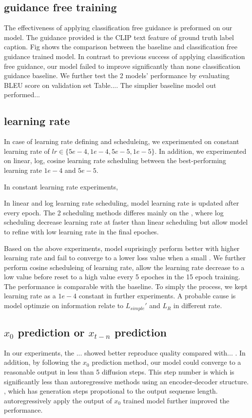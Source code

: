 \documentclass{article}
\begin{document}
\subsection{guidance free training}
The effectiveness of applying classification free guidance is preformed on our model. The guidance provided is the CLIP text feature of ground truth label caption. Fig shows the comparison between the baseline and classification free guidance trained model. In contrast to previous success of applying classification free guidance, our model failed to improve significantly than none classification guidance baseline. We further test the 2 models' performance by evaluating BLEU score on validation set Table.... The simplier baseline model out performed...

\subsection{learning rate}
In case of learning rate defining and scheduleing, we experimented on constant learning rate of $lr \in \{5e-4, 1e-4, 5e-5, 1e-5\}$. In addition, we experimented on linear, log, cosine learning rate scheduling between the best-performing learning rate $1e-4$ and $5e-5$. 

In constant learning rate experiments, 

In linear and log learning rate scheduling, model learning rate is updated after every epoch. The 2 scheduling methods differes mainly on the , where log scheduling decrease learning rate at faster than linear scheduling but allow model to refine with low learning rate in the final epoches. 

Based on the above experiments, model suprisingly perform better with higher learning rate and fail to converge to a lower loss value when a small . We further perform cosine scheduleing of learning rate, allow the learning rate decrease to a low value before reset to a high value every 5 epoches in the 15 epoch training. The performance is comparable with the baseline. To simply the process, we kept learning rate as a $1e-4$ constant in further experiments. A probable cause is model optimzie on information relate to $L_{simple}'$ and $L_R$ in different rate. 

\subsection{$x_0$ prediction or $x_{t-n}$ prediction}
In our experiments, the ... showed better reproduce quality compared with... {}. In addition, by following the $x_0$ prediction method, our model could converge to a reasonable output in less than 5 diffusion steps. This step number is which is significantly less than autoregressive methods using an encoder-decoder structure. , which has generation steps propotional to the output sequense length. autoregressively apply the output of $x_0$ trained model further improved the performance. {}
\end{document}
